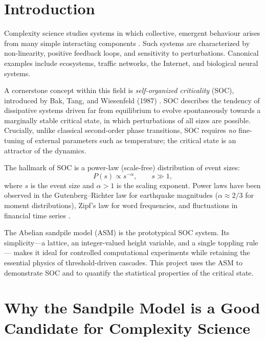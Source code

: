 \documentclass[12pt,a4paper]{article}
\begin{document}
\section{Introduction}
\label{sec:intro}

Complexity science studies systems in which collective, emergent behaviour arises from
many simple interacting components \cite{bak1987}.  Such systems are characterized by
non-linearity, positive feedback loops, and sensitivity to perturbations.  Canonical
examples include ecosystems, traffic networks, the Internet, and biological neural systems.

A cornerstone concept within this field is \emph{self-organized criticality} (SOC),
introduced by Bak, Tang, and Wiesenfeld (1987) \cite{bak1987}.  SOC describes the
tendency of dissipative systems driven far from equilibrium to evolve spontaneously
towards a marginally stable critical state, in which perturbations of all sizes are
possible.  Crucially, unlike classical second-order phase transitions, SOC requires
\emph{no} fine-tuning of external parameters such as temperature; the critical state
is an attractor of the dynamics.

The hallmark of SOC is a power-law (scale-free) distribution of event sizes:
\begin{equation}
  P(s) \propto s^{-\alpha}, \qquad s \gg 1,
  \label{eq:powerlaw}
\end{equation}
where $s$ is the event size and $\alpha>1$ is the scaling exponent.  Power laws
have been observed in the Gutenberg--Richter law for earthquake magnitudes
($\alpha\approx2/3$ for moment distributions), Zipf's law for word frequencies,
and fluctuations in financial time series \cite{newman2011}.

The Abelian sandpile model (ASM) \cite{bak1987} is the prototypical SOC system.
Its simplicity—a lattice, an integer-valued height variable, and a single toppling rule—
makes it ideal for controlled computational experiments while retaining the essential
physics of threshold-driven cascades.  This project uses the ASM to demonstrate SOC
and to quantify the statistical properties of the critical state.

\section{Why the Sandpile Model is a Good Candidate for Complexity Science}
\label{sec:why}
\end{document}
